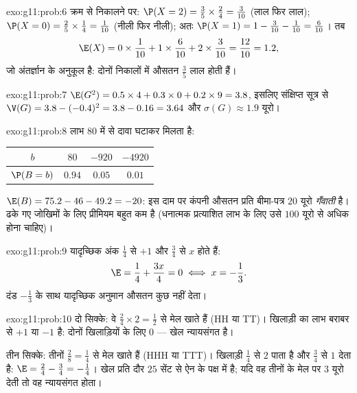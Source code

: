 \begin{solution}{exo:g11:prob:6}
क्रम से निकालने पर: $\P(X = 2) = \frac35 \times \frac24 = \frac{3}{10}$ (लाल फिर लाल); $\P(X = 0) = \frac25 \times \frac14 = \frac{1}{10}$ (नीली फिर नीली); अतः $\P(X = 1) = 1 - \frac{3}{10} - \frac{1}{10} = \frac{6}{10}$। तब
\[
\E(X) = 0 \times \frac1{10} + 1 \times \frac6{10} + 2 \times \frac3{10}
= \frac{12}{10} = 1.2 ,
\]
जो अंतर्ज्ञान के अनुकूल है: दोनों निकालों में औसतन $\frac35$ लाल होती हैं।
\end{solution}

\begin{solution}{exo:g11:prob:7}
$\E(G^2) = 0.5 \times 4 + 0.3 \times 0 + 0.2 \times 9 = 3.8$, इसलिए संक्षिप्त सूत्र से $\V(G) = 3.8 - (-0.4)^2 = 3.8 - 0.16 = 3.64$ और $\sigma(G) \approx 1.9$ यूरो।
\end{solution}

\begin{solution}{exo:g11:prob:8}
लाभ $80$ में से दावा घटाकर मिलता है:
\begin{center}
\begin{tabular}{c|ccc}
$b$ & $80$ & $-920$ & $-4920$\\
\hline
$\P(B=b)$ & $0.94$ & $0.05$ & $0.01$
\end{tabular}
\end{center}
$\E(B) = 75.2 - 46 - 49.2 = -20$: इस दाम पर कंपनी औसतन प्रति बीमा-पत्र $20$ यूरो \emph{गँवाती} है।
ढके गए जोखिमों के लिए प्रीमियम बहुत कम है (धनात्मक प्रत्याशित लाभ के लिए उसे
$100$ यूरो से अधिक होना चाहिए)।
\end{solution}

\begin{solution}{exo:g11:prob:9}
यादृच्छिक अंक  $\frac14$ से $+1$ और  $\frac34$ से $x$ होते हैं:
\[
\E = \frac14 + \frac{3x}{4} = 0 \iff x = -\frac13 .
\]
दंड $-\frac13$ के साथ यादृच्छिक अनुमान औसतन कुछ नहीं देता।
\end{solution}

\begin{solution}{exo:g11:prob:10}
दो सिक्के: वे  $\frac24 \times 2 =
\frac12$ से मेल खाते हैं (HH या TT)। खिलाड़ी का लाभ
बराबर  से $+1$ या $-1$ है: दोनों खिलाड़ियों के लिए  $0$
--- खेल न्यायसंगत है।

तीन सिक्के: तीनों  $\frac{2}{8} =
\frac14$ से मेल खाते हैं (HHH या TTT)। खिलाड़ी
 $\frac14$ से $2$ पाता है और  $\frac34$ से $1$ देता है: $\E = \frac24 - \frac34 = -\frac14$। खेल
प्रति दौर $25$ सेंट से ऐन के पक्ष में है; यदि वह तीनों के मेल पर $3$ यूरो
देती तो वह न्यायसंगत होता।
\end{solution}

